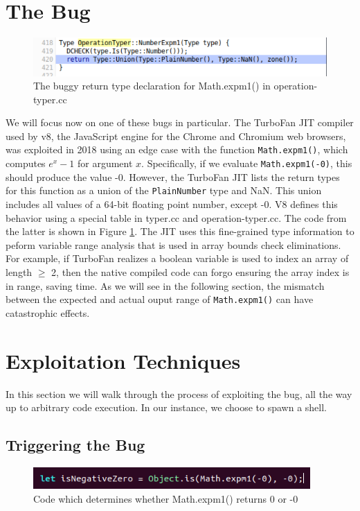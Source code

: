 \documentclass[11pt]{article}
\begin{document}
\section{The Bug}
\begin{figure}
	\includegraphics[width=\linewidth]{typer.png}
	\caption{The buggy return type declaration for Math.expm1() in operation-typer.cc}
  \label{fig:typer}
\end{figure}	
We will focus now on one of these bugs in particular. The TurboFan JIT compiler used by v8, the
JavaScript engine for the Chrome and Chromium web browsers, was exploited in 2018 using an edge case
with the function \texttt{Math.expm1()}, which computes $e^x -1$ for argument $x$.  Specifically, if
we evaluate \texttt{Math.expm1(-0)}, this should produce the value -0.  However, the TurboFan JIT
lists the return types for this function as a union of the \texttt{PlainNumber} type and NaN. This
union includes all values of a 64-bit floating point number, except -0. V8 defines this behavior
using a special table in typer.cc and operation-typer.cc. The code from the latter is shown in
Figure \ref{fig:typer}. The JIT uses this fine-grained type information to peform variable range
analysis that is used in array bounds check eliminations. For example, if TurboFan realizes a
boolean variable is used to index an array of length $\geq$ 2, then the native compiled code can
forgo ensuring the array index is in range, saving time. As we will see in the following section,
the mismatch between the expected and actual ouput range of \texttt{Math.expm1()} can have
catastrophic effects.

\section{Exploitation Techniques}
In this section we will walk through the process of exploiting the bug, all the way up to arbitrary
code execution. In our instance, we choose to spawn a shell.

\subsection{Triggering the Bug}

\begin{figure}
	\centering
	\includegraphics[width=300pt]{example1.png}
	\caption{Code which determines whether Math.expm1() returns 0 or -0}
  \label{fig:example1}
\end{figure}
\end{document}
